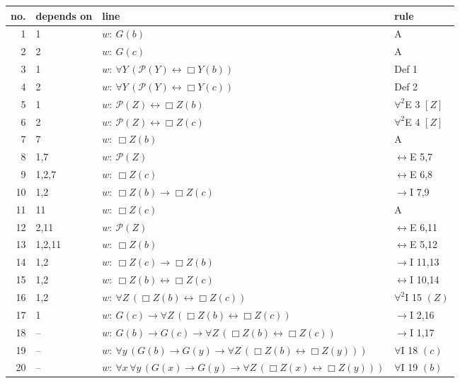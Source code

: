 {\footnotesize\setlength{\tabcolsep}{4pt}
\begin{longtable}{@{}r>{\raggedright}p{}p{}>{\raggedright\arraybackslash}p{}@{}}\toprule
no. & depends on & line & rule\\\midrule\endhead
1 & 1 & $w:\ G(b)$ & A\\
2 & 2 & $w:\ G(c)$ & A\\
3 & 1 & $w:\ \forall Y\, (\mathcal{P}(Y) \leftrightarrow \Box Y(b))$ & Def 1\\
4 & 2 & $w:\ \forall Y\, (\mathcal{P}(Y) \leftrightarrow \Box Y(c))$ & Def 2\\
5 & 1 & $w:\ \mathcal{P}(Z) \leftrightarrow \Box Z(b)$ & $\forall^2$E 3 $[Z]$\\
6 & 2 & $w:\ \mathcal{P}(Z) \leftrightarrow \Box Z(c)$ & $\forall^2$E 4 $[Z]$\\
7 & 7 & $w:\ \Box Z(b)$ & A\\
8 & 1,7 & $w:\ \mathcal{P}(Z)$ & $\leftrightarrow$E 5,7\\
9 & 1,2,7 & $w:\ \Box Z(c)$ & $\leftrightarrow$E 6,8\\
10 & 1,2 & $w:\ \Box Z(b) \to \Box Z(c)$ & $\to$I 7,9\\
11 & 11 & $w:\ \Box Z(c)$ & A\\
12 & 2,11 & $w:\ \mathcal{P}(Z)$ & $\leftrightarrow$E 6,11\\
13 & 1,2,11 & $w:\ \Box Z(b)$ & $\leftrightarrow$E 5,12\\
14 & 1,2 & $w:\ \Box Z(c) \to \Box Z(b)$ & $\to$I 11,13\\
15 & 1,2 & $w:\ \Box Z(b) \leftrightarrow \Box Z(c)$ & $\leftrightarrow$I 10,14\\
16 & 1,2 & $w:\ \forall Z\, (\Box Z(b) \leftrightarrow \Box Z(c))$ & $\forall^2$I 15 $(Z)$\\
17 & 1 & $w:\ G(c) \to \forall Z\, (\Box Z(b) \leftrightarrow \Box Z(c))$ & $\to$I 2,16\\
18 & -- & $w:\ G(b) \to G(c) \to \forall Z\, (\Box Z(b) \leftrightarrow \Box Z(c))$ & $\to$I 1,17\\
19 & -- & $w:\ \forall y\, (G(b) \to G(y) \to \forall Z\, (\Box Z(b) \leftrightarrow \Box Z(y)))$ & $\forall$I 18 $(c)$\\
20 & -- & $w:\ \forall x\, \forall y\, (G(x) \to G(y) \to \forall Z\, (\Box Z(x) \leftrightarrow \Box Z(y)))$ & $\forall$I 19 $(b)$\\
\bottomrule\end{longtable}}
